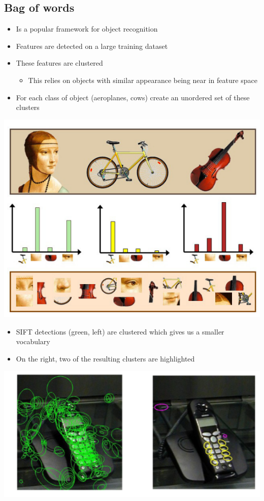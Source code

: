 \documentclass[a4paper]{article}
\begin{document}
\subsection{Bag of words}
\label{sec-3-5}
\begin{itemize}
\item Is a popular framework for object recognition
\item Features are detected on a large training dataset
\item These features are clustered
\begin{itemize}
\item This relies on objects with similar appearance being near in feature space
\end{itemize}
\item For each class of object (aeroplanes, cows) create an unordered set of these clusters
\end{itemize}
\includegraphics[width=.9\linewidth]{./bagofwords.png} 

\begin{itemize}
\item SIFT detections (green, left) are clustered which gives us a smaller vocabulary
\item On the right, two of the resulting clusters are highlighted
\end{itemize}
\includegraphics[width=.9\linewidth]{./sift.png}
\end{document}
